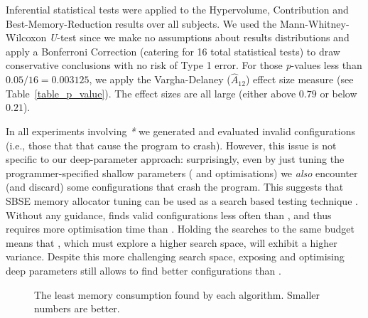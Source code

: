 Inferential statistical tests were applied to the Hypervolume, Contribution and Best-Memory-Reduction results over all subjects.
We used the Mann-Whitney-Wilcoxon \emph{U}-test since we make no assumptions about results distributions and apply a Bonferroni Correction (catering for 16 total statistical tests) to draw conservative conclusions with no risk of Type 1 error.
For those \emph{p}-values less than $0.05/16=0.003125$, we apply the
Vargha-Delaney ($\hat{A}_{12}$) effect size measure (see Table~\ref{table_p_value}).
The effect sizes are all large (either above $0.79$ or below $0.21$).

In all experiments involving \emph{\all{}*} we generated and evaluated invalid
configurations (i.e., those that that cause the program to crash). However,
this issue is not specific to our deep-parameter approach: 
surprisingly, even by just tuning the programmer-specified shallow parameters 
(\sr{} and \sn{} optimisations) we {\em also} encounter (and discard) some
configurations that crash the program.
This suggests that SBSE memory allocator tuning can be used as a search based testing technique \cite{mh:icst14-keynote}.
Without any guidance, \dr{}
finds valid configurations less often than \sr{}, and thus requires more
optimisation time than \sr{}. Holding the searches to the same budget means
that \dn{}, which must explore a higher search space, will exhibit a higher
variance. 
Despite this more challenging search space, exposing and optimising deep
parameters still allows \dn{} to find better configurations
than \sn{}.

\begin{figure}[htb]
	\centering
	\vspace{-1.2em}
	\caption{The least memory consumption found by each algorithm. Smaller numbers are better.}\label{fig_best_memory}
	
	
\end{figure}

